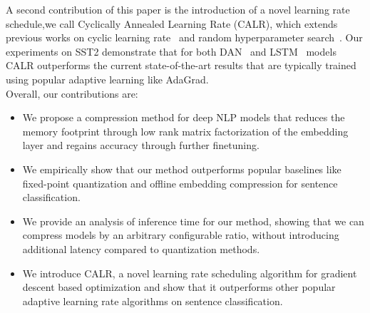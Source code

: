 A second contribution of this paper is the introduction of a novel learning rate schedule,we call Cyclically Annealed Learning Rate (CALR), which extends previous works on cyclic learning rate~\cite{smith2017cyclical} and random hyperparameter search~\cite{bergstra2012random}. Our experiments on SST2 demonstrate that for both DAN~\cite{iyyer2015deep} and LSTM~\cite{hochreiter_lstm} models CALR outperforms the current state-of-the-art results that are typically trained using popular adaptive learning like AdaGrad. \\
Overall, our contributions are: %
\begin{itemize}[noitemsep, topsep=0pt ]
\item We propose a compression method for deep NLP models that reduces the memory
footprint through low rank matrix factorization of the embedding layer and regains accuracy through further finetuning.
\item We empirically show that our method outperforms popular baselines like fixed-point quantization and offline embedding compression for sentence classification.
\item We provide an analysis of inference time for our method, showing that we can compress models by an arbitrary configurable ratio, without introducing additional latency compared to quantization methods.
\item We introduce CALR, a novel learning rate scheduling algorithm for gradient descent based optimization and show that it outperforms other popular adaptive learning rate algorithms on sentence classification.
\end{itemize}








